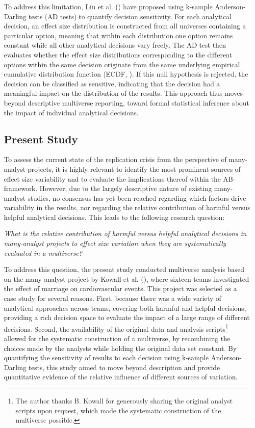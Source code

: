 \documentclass[
  man,
  floatsintext,
  longtable,
  nolmodern,
  notxfonts,
  notimes,
  colorlinks=true,linkcolor=blue,citecolor=blue,urlcolor=blue]{apa7}
\begin{document}
To address this limitation, Liu et al.
() have proposed using
k-sample Anderson-Darling tests (AD tests) to quantify decision
sensitivity. For each analytical decision, an effect size distribution
is constructed from all universes containing a particular option,
meaning that within each distribution one option remains constant while
all other analytical decisions vary freely. The AD test then evaluates
whether the effect size distributions corresponding to the different
options within the same decision originate from the same underlying
empirical cumulative distribution function (ECDF,
). If this
null hypothesis is rejected, the decision can be classified as
sensitive, indicating that the decision had a meaningful impact on the
distribution of the results. This approach thus moves beyond descriptive
multiverse reporting, toward formal statistical inference about the
impact of individual analytical decisions.

\subsection{Present Study}\label{present-study}

To assess the current state of the replication crisis from the
perspective of many-analyst projects, it is highly relevant to identify
the most prominent sources of effect size variability and to evaluate
the implications thereof within the AB-framework. However, due to the
largely descriptive nature of existing many-analyst studies, no
consensus has yet been reached regarding which factors drive variability
in the results, nor regarding the relative contribution of harmful
versus helpful analytical decisions. This leads to the following
research question:

\emph{What is the relative contribution of harmful versus helpful
analytical decisions in many-analyst projects to effect size variation
when they are systematically evaluated in a multiverse?}

To address this question, the present study conducted multiverse
analysis based on the many-analyst project by Kowall et al.
(), where sixteen teams
investigated the effect of marriage on cardiovascular events. This
project was selected as a case study for several reasons. First, because
there was a wide variety of analytical approaches across teams, covering
both harmful and helpful decisions, providing a rich decision space to
evaluate the impact of a large range of different decisions. Second, the
availability of the original data and analysis scripts\footnote{The
  author thanks B. Kowall for generously sharing the original analyst
  scripts upon request, which made the systematic construction of the
  multiverse possible.} allowed for the systematic construction of a
multiverse, by recombining the choices made by the analysts while
holding the original data set constant. By quantifying the sensitivity
of results to each decision using k-sample Anderson-Darling tests, this
study aimed to move beyond description and provide quantitative evidence
of the relative influence of different sources of variation.
\end{document}
